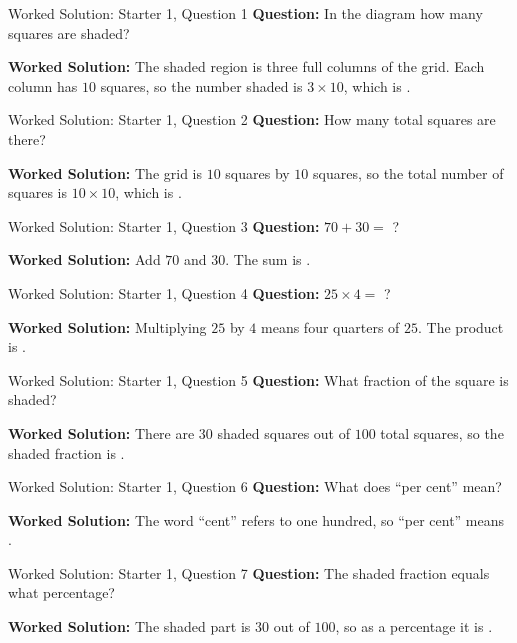 \documentclass{beamer}
\newcommand{\ablank}[1]{%
  \alt<2>{\textcolor{red}{#1}}{\underline{\phantom{#1}}}%
}
\begin{document}
\begin{frame}[t]{Worked Solution: Starter 1, Question 1}
\hypertarget{work-st1}{}
\textbf{Question:} In the diagram how many squares are shaded?

\smallskip
\textbf{Worked Solution:} The shaded region is three full columns of the grid. Each column has \(10\) squares, so the number shaded is \(3 \times 10\), which is \ablank{$30$}.
\end{frame}

\begin{frame}[t]{Worked Solution: Starter 1, Question 2}
\textbf{Question:} How many total squares are there?

\smallskip
\textbf{Worked Solution:} The grid is \(10\) squares by \(10\) squares, so the total number of squares is \(10 \times 10\), which is \ablank{$100$}.
\end{frame}

\begin{frame}[t]{Worked Solution: Starter 1, Question 3}
\textbf{Question:} \(70 + 30 =\) ?

\smallskip
\textbf{Worked Solution:} Add \(70\) and \(30\). The sum is \ablank{$100$}.
\end{frame}

\begin{frame}[t]{Worked Solution: Starter 1, Question 4}
\textbf{Question:} \(25 \times 4 =\) ?

\smallskip
\textbf{Worked Solution:} Multiplying \(25\) by \(4\) means four quarters of \(25\). The product is \ablank{$100$}.
\end{frame}

\begin{frame}[t]{Worked Solution: Starter 1, Question 5}
\textbf{Question:} What fraction of the square is shaded?

\smallskip
\textbf{Worked Solution:} There are \(30\) shaded squares out of \(100\) total squares, so the shaded fraction is \ablank{$\tfrac{30}{100}$}.
\end{frame}

\begin{frame}[t]{Worked Solution: Starter 1, Question 6}
\textbf{Question:} What does ``per cent'' mean?

\smallskip
\textbf{Worked Solution:} The word ``cent'' refers to one hundred, so ``per cent'' means \ablank{out of 100}.
\end{frame}

\begin{frame}[t]{Worked Solution: Starter 1, Question 7}
\textbf{Question:} The shaded fraction equals what percentage?

\smallskip
\textbf{Worked Solution:} The shaded part is \(30\) out of \(100\), so as a percentage it is \ablank{$30\%$}.
\end{frame}
\end{document}
